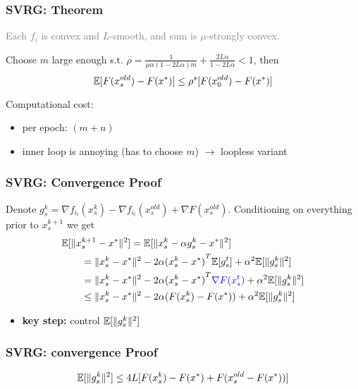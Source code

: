 \documentclass[aspectratio=149]{beamer}
\begin{document}
\begin{frame}
  \frametitle{SVRG: Theorem}

  \textcolor{gray}{Each $f_i$ is convex and $L$-smooth, and sum is $\mu$-strongly convex.}

  \begin{theorem}
    Choose $m$ large enough s.t. $\rho = \frac{1}{\mu \alpha (1-2L \alpha)m} + \frac{2L \alpha}{1-2L \alpha}< 1$, then
    \begin{equation}
      \mathbb{E}[F(x_s^{old})- F(x^*)] \le \rho^s [F(x_0^{old})-F(x^*)]
    \end{equation}
  \end{theorem}
  Computational cost:
  \begin{itemize}
    \item per epoch: $(m+n)$
    \item inner loop is annoying (has to choose $m$) $\rightarrow$ loopless variant
  \end{itemize}
\end{frame}

\begin{frame}
  \frametitle{SVRG: Convergence Proof}
  Denote $g_s^k = \nabla f_{i_l}(x_s^k) - \nabla f_{i_l}(x_s^{old}) + \nabla F(x_s^{old})$. Conditioning on everything prior to $x_s^{k+1}$ we get
  \begin{equation}
    \begin{aligned}
      \MoveEqLeft \E [\Vert x_s^{k+1} - x^* \Vert^2] = \E [\Vert x_s^{k}- \alpha g_s^k - x^* \Vert^2] \\
      &= \Vert x_s^k-x^* \Vert^2 - 2 \alpha {(x_s^k-x^* )}^T \E[g_s^t] + \alpha^2 \E[\Vert g_s^k \Vert^2] \\
      &= \Vert x_s^k-x^* \Vert^2 - 2 \alpha {(x_s^k-x^* )}^T \textcolor{blue}{\nabla F(x_s^t)} + \alpha^2 \E[\Vert g_s^k \Vert^2] \\
      &\le \Vert x_s^k-x^* \Vert^2 - 2 \alpha (F(x_s^k) - F(x^*))+ \alpha^2 \E[\Vert g_s^k \Vert^2]
    \end{aligned}
  \end{equation}

  \begin{itemize}
     \item \textbf{key step:} control $\mathbb{E}[\Vert g_s^k \Vert^2]$
   \end{itemize}
\end{frame}

\begin{frame}
  \frametitle{SVRG: convergence Proof}
  \begin{lemma}%
    \begin{equation}
      \mathbb{E}[\Vert g_s^k \Vert^2] \le 4L [ F(x_s^k)- F(x^*) + F(x_s^{old}-F(x^*)) ]
    \end{equation}

  \end{lemma}

\end{frame}
\end{document}
